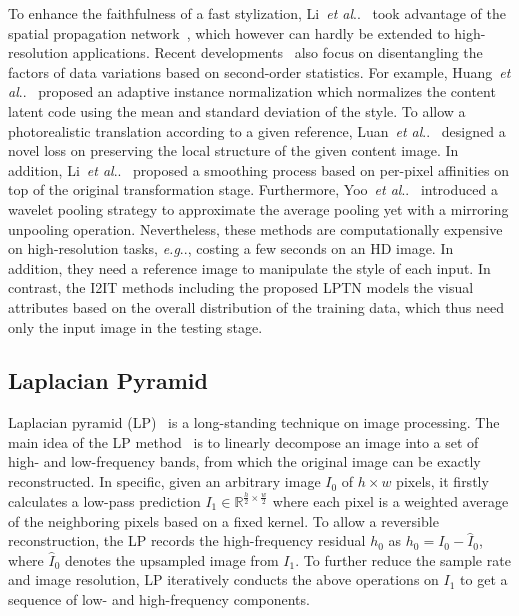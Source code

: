 \documentclass[10pt,twocolumn,letterpaper]{article}
\makeatletter
\DeclareRobustCommand\onedot{\futurelet\@let@token\@onedot}
\def\@onedot{\ifx\@let@token.\else.\null\fi\xspace}
\def\eg{\emph{e.g}\onedot} \def\Eg{\emph{E.g}\onedot}
\def\etal{\emph{et al}\onedot}
\makeatother
\begin{document}
	To enhance the faithfulness of a fast stylization, Li~\etal~\cite{li2019learning} took advantage of the spatial propagation network~\cite{liu2017learning}, which however can hardly be extended to high-resolution applications. Recent developments~\cite{Disentangler_NeurIPS2018, huang2018multimodal, lee2018diverse, gonzalez2018image, ganin2014unsupervised, yoo2019photorealistic, puy2019flexible} also focus on disentangling the factors of data variations based on second-order statistics. For example, Huang~\etal~\cite{huang2017arbitrary} proposed an adaptive instance normalization which normalizes the content latent code using the mean and standard deviation of the style. To allow a photorealistic translation according to a given reference, Luan~\etal~\cite{luan2017deep} designed a novel loss on preserving the local structure of the given content image. In addition, Li~\etal~\cite{li2018closed} proposed a smoothing process based on per-pixel affinities on top of the original transformation stage. Furthermore, Yoo~\etal~\cite{yoo2019photorealistic} introduced a wavelet pooling strategy to approximate the average pooling yet with a mirroring unpooling operation. Nevertheless, these methods are computationally expensive on high-resolution tasks, \eg, costing a few seconds on an HD image. In addition, they need a reference image to manipulate the style of each input. In contrast, the I2IT methods including the proposed LPTN models the visual attributes based on the overall distribution of the training data, which thus need only the input image in the testing stage.
	
	
	\subsection{Laplacian Pyramid}
	\label{relatedwork_laplacian}
	
	Laplacian pyramid (LP)~\cite{burt1983laplacian} is a long-standing technique on image processing. The main idea of the LP method~\cite{burt1983laplacian} is to linearly decompose an image into a set of high- and low-frequency bands, from which the original image can be exactly reconstructed. In specific, given an arbitrary image $I_0$ of $h\times w$ pixels, it firstly calculates a low-pass prediction $ I_1\in\mathbb{R}^{\frac{h}{2}\times \frac{w}{2}} $ where each pixel is a weighted average of the neighboring pixels based on a fixed kernel. To allow a reversible reconstruction, the LP records the high-frequency residual $ h_0 $ as $ h_0 = I_0 - \hat{I}_0 $, where $ \hat{I}_0 $ denotes the upsampled image from $I_1$. To further reduce the sample rate and image resolution, LP iteratively conducts the above operations on $I_1$ to get a sequence of low- and high-frequency components.
	
\end{document}
